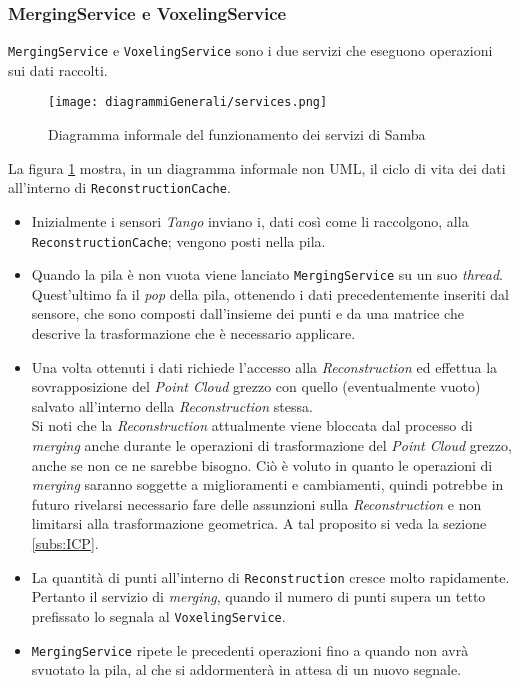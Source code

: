 \subsubsection{MergingService e VoxelingService}
\texttt{MergingService} e \texttt{VoxelingService} sono i due servizi che eseguono operazioni sui dati raccolti.
\begin{figure}[!h] 
    \centering 
    \texttt{[image: diagrammiGenerali/services.png]} 
    \caption{Diagramma informale del funzionamento dei servizi di Samba}
    \label{fig:services}
\end{figure}
La figura \ref{fig:services} mostra, in un diagramma informale non UML, il ciclo di vita dei dati all'interno di \texttt{ReconstructionCache}.
\begin{itemize}
	\item Inizialmente i sensori \emph{Tango} inviano i, dati così come li raccolgono, alla \texttt{ReconstructionCache}; vengono posti nella pila.
	\item Quando la pila è non vuota viene lanciato \texttt{MergingService} su un suo \emph{thread}. Quest'ultimo fa il \emph{pop} della pila, ottenendo i dati precedentemente inseriti dal sensore, che sono composti dall'insieme dei punti e da una matrice che descrive la trasformazione che è necessario applicare.
	\item Una volta ottenuti i dati richiede l'accesso alla \emph{Reconstruction} ed effettua la sovrapposizione del \emph{Point Cloud} grezzo con quello (eventualmente vuoto) salvato all'interno della \emph{Reconstruction} stessa.\\Si noti che la \emph{Reconstruction} attualmente viene bloccata dal processo di \emph{merging} anche durante le operazioni di trasformazione del \emph{Point Cloud} grezzo, anche se non ce ne sarebbe bisogno. Ciò è voluto in quanto le operazioni di \emph{merging} saranno soggette a miglioramenti e cambiamenti, quindi potrebbe in futuro rivelarsi necessario fare delle assunzioni sulla \emph{Reconstruction} e non limitarsi alla trasformazione geometrica. A tal proposito si veda la sezione \ref{subs:ICP}.
	\item La quantità di punti all'interno di \texttt{Reconstruction} cresce molto rapidamente. Pertanto il servizio di \emph{merging}, quando il numero di punti supera un tetto prefissato lo segnala al \texttt{VoxelingService}.
	\item \texttt{MergingService} ripete le precedenti operazioni fino a quando non avrà svuotato la pila, al che si addormenterà in attesa di un nuovo segnale.

\end{itemize}
